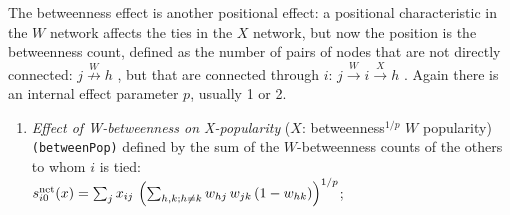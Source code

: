 \documentclass[a4paper,fleqn,11pt]{article}
\newcommand{\+}{\, + \,}
\newcommand{\vit}{\theenumi}
\newcounter{savenumi}
\begin{document}
\smallskip
The betweenness effect is another positional effect:
a positional characteristic in the $W$ network affects the
ties in the $X$ network, but now the position is the betweenness count,
defined as the number of pairs of nodes that are not directly connected:
 $j \stackrel{W}{\nrightarrow} h$ ,
but that are connected through $i$:
 $j \stackrel{W}{\rightarrow} i  \stackrel{X}{\rightarrow} h$ .
 Again there is an internal effect parameter $p$, usually
1 or 2.
\begin{enumerate}
\setcounter{enumi}{\value{savenumi}}
 \item
{\em Effect of W-betweenness on X-popularity } ($X$: betweenness$^{1/p}$ $W$ popularity)  \\
 \texttt{(betweenPop)}
 defined by   the sum of  the $W$-betweenness counts of the others to whom $i$ is tied:\\[0.2em]
 $s^{\rm net}_{i\vit}(x) =  \sum_j x_{ij}\,
        \left(\sum_{h,k; h \neq k}w_{hj}\,w_{jk}\,(1-w_{hk})\right)^{1/p}  $;\\


\end{enumerate}
\end{document}
